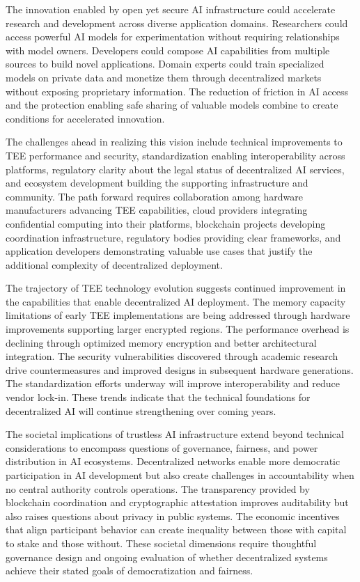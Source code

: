 The innovation enabled by open yet secure AI infrastructure could accelerate research and development across diverse application domains. Researchers could access powerful AI models for experimentation without requiring relationships with model owners. Developers could compose AI capabilities from multiple sources to build novel applications. Domain experts could train specialized models on private data and monetize them through decentralized markets without exposing proprietary information. The reduction of friction in AI access and the protection enabling safe sharing of valuable models combine to create conditions for accelerated innovation.

The challenges ahead in realizing this vision include technical improvements to TEE performance and security, standardization enabling interoperability across platforms, regulatory clarity about the legal status of decentralized AI services, and ecosystem development building the supporting infrastructure and community. The path forward requires collaboration among hardware manufacturers advancing TEE capabilities, cloud providers integrating confidential computing into their platforms, blockchain projects developing coordination infrastructure, regulatory bodies providing clear frameworks, and application developers demonstrating valuable use cases that justify the additional complexity of decentralized deployment.

The trajectory of TEE technology evolution suggests continued improvement in the capabilities that enable decentralized AI deployment. The memory capacity limitations of early TEE implementations are being addressed through hardware improvements supporting larger encrypted regions. The performance overhead is declining through optimized memory encryption and better architectural integration. The security vulnerabilities discovered through academic research drive countermeasures and improved designs in subsequent hardware generations. The standardization efforts underway will improve interoperability and reduce vendor lock-in. These trends indicate that the technical foundations for decentralized AI will continue strengthening over coming years.

The societal implications of trustless AI infrastructure extend beyond technical considerations to encompass questions of governance, fairness, and power distribution in AI ecosystems. Decentralized networks enable more democratic participation in AI development but also create challenges in accountability when no central authority controls operations. The transparency provided by blockchain coordination and cryptographic attestation improves auditability but also raises questions about privacy in public systems. The economic incentives that align participant behavior can create inequality between those with capital to stake and those without. These societal dimensions require thoughtful governance design and ongoing evaluation of whether decentralized systems achieve their stated goals of democratization and fairness.

